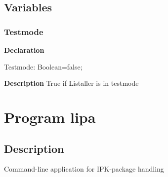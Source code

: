 \documentclass{report}
\newif\ifpdf
\begin{document}
\section{Variables}
\ifpdf
\subsection*{\large{\textbf{Testmode}}\normalsize\hspace{1ex}\hrulefill}
\else
\subsection*{Testmode}
\fi
\label{licommon-Testmode}
\begin{list}{}{
\setlength{\itemindent}{0cm}
\setlength{\listparindent}{0cm}
\setlength{\leftmargin}{\evensidemargin}
\addtolength{\leftmargin}{\tmplength}
\settowidth{\labelsep}{X}
\addtolength{\leftmargin}{\labelsep}
\setlength{\labelwidth}{\tmplength}
}
\item[\textbf{Declaration}\hfill]
\ifpdf
\begin{flushleft}
\fi
\begin{ttfamily}
Testmode: Boolean=false;\end{ttfamily}

\ifpdf
\end{flushleft}
\fi

\par
\item[\textbf{Description}]
True if Listaller is in testmode

\end{list}
\chapter{Program lipa}
\label{lipa}
\section{Description}
Command{-}line application for IPK{-}package handling
\end{document}
